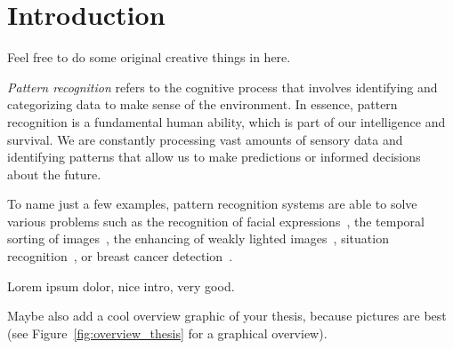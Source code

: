 \chapter{Introduction}
\label{chp:1}
\epigraph{Feel free to do some original creative things in here. }
{}

\textit{Pattern recognition} refers to the cognitive process that involves identifying and categorizing data to make sense of the environment. In essence, pattern recognition is a fundamental human ability, which is part of our intelligence and survival. We are constantly processing vast amounts of sensory data and identifying patterns that allow us to make predictions or informed decisions about the future. 

To name just a few examples, pattern recognition systems are able to solve various problems such as the recognition of facial expressions~\cite{siyue2019deep}, the temporal sorting of images~\cite{LORE2017650}, the enhancing of weakly lighted images~\cite{li2018lightennet}, situation recognition~\cite{jing2020relational}, or breast cancer detection~\cite{kahn19cancer}. 

Lorem ipsum dolor, nice intro, very good.

Maybe also add a cool overview graphic of your thesis, because pictures are best (see Figure~\ref{fig:overview_thesis} for a graphical overview). 







